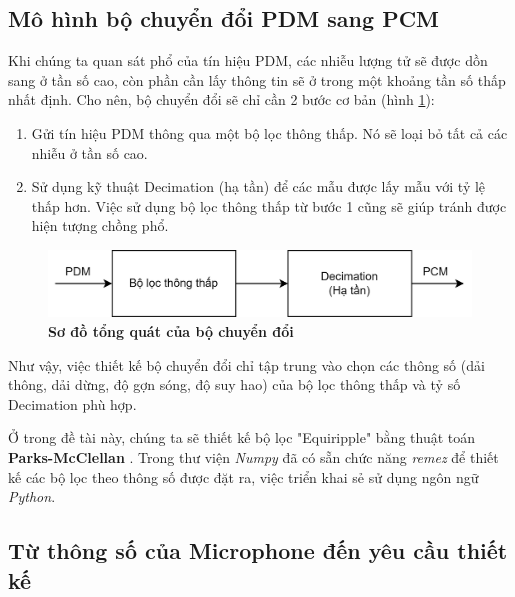 \subsection{Mô hình bộ chuyển đổi PDM sang PCM}
Khi chúng ta quan sát phổ của tín hiệu PDM, các nhiễu lượng tử sẽ được dồn sang ở tần số cao, còn phần cần lấy thông tin sẽ ở trong một khoảng tần số thấp nhất định. Cho nên, bộ chuyển đổi sẽ chỉ cần 2 bước cơ bản (hình \ref{pdm2pcm_top}):
\begin{enumerate}
    \item Gửi tín hiệu PDM thông qua một bộ lọc thông thấp. Nó sẽ loại bỏ tất cả các nhiễu ở tần số cao.
    \item Sử dụng kỹ thuật Decimation (hạ tần) để các mẫu được lấy mẫu với tỷ lệ thấp hơn. Việc sử dụng bộ lọc thông thấp từ bước 1 cũng sẽ giúp tránh được hiện tượng chồng phổ.
\end{enumerate}

\begin{figure}[H]
    \centering
    \includegraphics[width=12cm]{Images/Chuong3/pdm2pcm_top.png}
    \caption[Sơ đồ tổng quát của bộ chuyển đổi]{\bfseries \fontsize{12pt}{0pt}\selectfont Sơ đồ tổng quát của bộ chuyển đổi}
    \label{pdm2pcm_top}
\end{figure}

Như vậy, việc thiết kế bộ chuyển đổi chỉ tập trung vào chọn các thông số (dải thông, dải dừng, độ gợn sóng, độ suy hao) của bộ lọc thông thấp và tỷ số Decimation phù hợp.

Ở trong đề tài này, chúng ta sẽ thiết kế bộ lọc "Equiripple" bằng thuật toán \textbf{Parks-McClellan} \cite{rao2018digital}. Trong thư viện \textit{Numpy} đã có sẵn chức năng \textit{remez} để thiết kế các bộ lọc theo thông số được đặt ra, việc triển khai sẻ sử dụng ngôn ngữ \textit{Python}.
\subsection{Từ thông số của Microphone đến yêu cầu thiết kế} \label{spec_muc}

